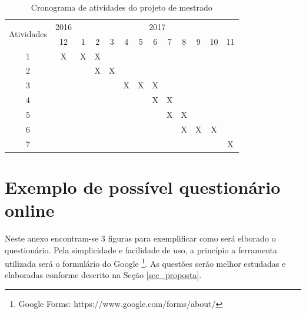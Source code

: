 \documentclass[quali]{ppgccufscar}
\begin{document}
\begin{table}[!ht]
\centering
\caption{Cronograma de atividades do projeto de mestrado}
\label{tabela_cronograma}
\begin{tabular}{|c|c|c|c|c|c|c|c|c|c|c|c|c|}
\hline
\multirow{2}{*}{Atividades} & 2016 & \multicolumn{11}{c|}{2017}                  \\ \cline{2-13} 
                            & 12   & 1 & 2 & 3 & 4 & 5 & 6 & 7 & 8 & 9 & 10 & 11 \\ \hline
1                           & X    & X & X &   &   &   &   &   &   &   &    &    \\ \hline
2                           &      &   & X & X &   &   &   &   &   &   &    &    \\ \hline
3                           &      &   &   &   & X & X & X &   &   &   &    &    \\ \hline
4                           &      &   &   &   &   &   & X & X &   &   &    &    \\ \hline
5                           &      &   &   &   &   &   &   & X & X &   &    &    \\ \hline
6                           &      &   &   &   &   &   &   &   & X & X & X  &    \\ \hline
7                           &      &   &   &   &   &   &   &   &   &   &    & X  \\ \hline
\end{tabular}
\end{table}




\anexo

\chapter{Exemplo de possível questionário online}
\label{anexo1}

Neste anexo encontram-se 3 figuras para exemplificar como será elborado o questionário. Pela simplicidade e facilidade de uso, a princípio a ferramenta utilizada será o formulário do Google \footnote{Google Forms: https://www.google.com/forms/about/}. As questões serão melhor estudadas e elaboradas conforme descrito na Seção \ref{sec_proposta}.
\end{document}
